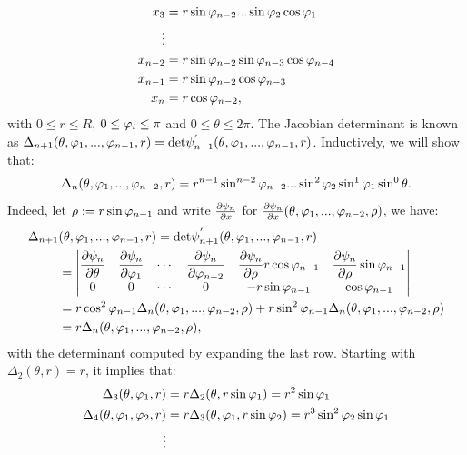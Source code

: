 \begin{problem}
\begin{solution}
\begin{itemize}
\begin{align*}
        x_3 &= r\sin \varphi_{n-2} ... \sin \varphi_2 \cos \varphi_1 \\
        \vdots \\
        x_{n-2} &= r \sin \varphi_{n-2} \sin \varphi_{n-3} \cos \varphi_{n-4} \\
        x_{n-1} &= r\sin \varphi_{n-2} \cos \varphi_{n-3} \\
        x_n &= r\cos \varphi_{n-2},
    \end{align*}
    with $0 \le r \le R$, $0\le \varphi_i \le \pi$ and $0\le \theta \le 2\pi$. The Jacobian determinant is known as $\Delta_{n+1} (\theta,\varphi_1,...,\varphi_{n-1},r) = \mathrm{det} \psi_{n+1}^{'} (\theta,\varphi_1,...,\varphi_{n-1},r) $. Inductively, we will show that:
    \begin{align}\label{eq:prob6b-2}
        \Delta_{n} (\theta,\varphi_1,...,\varphi_{n-2},r) = r^{n-1} \sin^{n-2}\varphi_{n-2}...\sin^2 \varphi_2 \sin^1 \varphi_1 \sin^0 \theta  .
    \end{align}
    Indeed, let $\rho := r\sin\varphi_{n-1}$ and write $\frac{\partial \psi_n}{\partial x}$ for $\frac{\partial \psi_n}{\partial x} (\theta, \varphi_1,...,\varphi_{n-2}, \rho)$, we have:
    \begin{align*}
        \Delta_{n+1} & (\theta,\varphi_1,...,\varphi_{n-1},r)  = \mathrm{det} \psi_{n+1}^{'} (\theta,\varphi_1,...,\varphi_{n-1},r) \\
        &=\begin{vmatrix}
        \dfrac{\partial \psi_n }{\partial \theta} &  \dfrac{\partial \psi_n }{\partial \varphi_1} & \cdots & \dfrac{\partial \psi_n }{\partial \varphi_{n-2}} &  \dfrac{\partial \psi_n }{\partial \rho} r\cos\varphi_{n-1} &  \dfrac{\partial \psi_n }{\partial \rho} \sin\varphi_{n-1} \\
        0 & 0 & \cdots & 0 & -r\sin\varphi_{n-1} & \cos\varphi_{n-1}
        \end{vmatrix} \\
        &= r\cos^2 \varphi_{n-1}\Delta_n (\theta,\varphi_1,...,\varphi_{n-2},\rho) + r\sin^2 \varphi_{n-1} \Delta_n (\theta,\varphi_1,...,\varphi_{n-2},\rho)  \\
        &= r \Delta_n (\theta,\varphi_1,...,\varphi_{n-2},\rho),
    \end{align*}
    with the determinant computed by expanding the last row. Starting with $\Delta_2 (\theta,r) = r$, it implies that:
    \begin{align*}
        \Delta_3 (\theta,\vp_1, r ) &= r \Delta_2 (\theta,r\sin\vp_1) = r^2 \sin \vp_1 \\
        \Delta_4 (\theta,\vp_1, \vp_2,r ) &= r \Delta_3 (\theta,\vp_1,r\sin\vp_2) = r^3 \sin^2 \vp_2 \sin \vp_1 \\
        \vdots \\

\end{align*}
\end{itemize}
\end{solution}
\end{problem}

